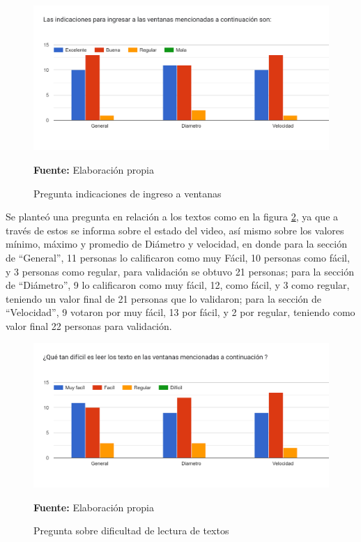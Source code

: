 \documentclass[12pt,twocolumn,a4paper]{article}
\begin{document}
\begin{figure}
	\centering
	\includegraphics[scale=0.3]{Encuesta6.png}
	\caption{Pregunta indicaciones de ingreso a ventanas} \textbf{Fuente:} Elaboración propia
	\label{Encuesta6}
\end{figure}

Se planteó una pregunta en relación a los textos como en la figura \ref{Encuesta7}, ya que a través de estos se informa sobre el estado del video, así mismo sobre los valores mínimo, máximo y promedio de Diámetro y velocidad, en donde para la sección de “General”, 11 personas lo calificaron como muy Fácil, 10 personas como fácil, y 3 personas como regular, para validación se obtuvo 21 personas; para la sección de “Diámetro”, 9 lo calificaron como muy fácil, 12, como fácil, y 3 como regular, teniendo un valor final de 21 personas que lo validaron; para la sección de “Velocidad”, 9 votaron por muy fácil, 13 por fácil, y 2 por regular, teniendo como valor final 22 personas para validación. 

\begin{figure}
	\centering
	\includegraphics[scale=0.3]{Encuesta7.png}
	\caption{Pregunta sobre dificultad de lectura de textos} \textbf{Fuente:} Elaboración propia
	\label{Encuesta7}
\end{figure} 
\end{document}
